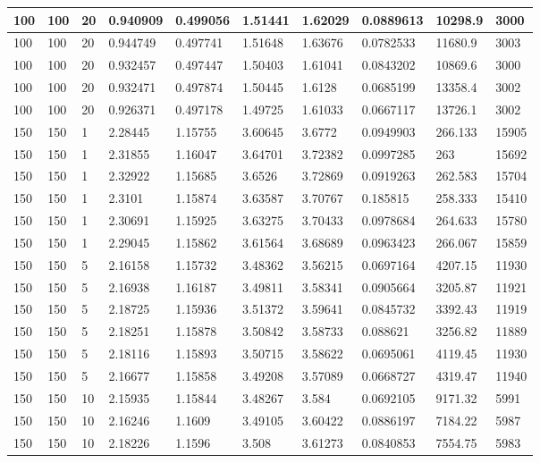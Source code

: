 \begin{landscape}
\begin{longtable}{ | l | l | l | l | l | l | l | l | l | l | }
100 & 100 & 20 & 0.940909 & 0.499056 & 1.51441 & 1.62029 & 0.0889613 & 10298.9 & 3000\\ \hline
100 & 100 & 20 & 0.944749 & 0.497741 & 1.51648 & 1.63676 & 0.0782533 & 11680.9 & 3003\\ \hline
100 & 100 & 20 & 0.932457 & 0.497447 & 1.50403 & 1.61041 & 0.0843202 & 10869.6 & 3000\\ \hline
100 & 100 & 20 & 0.932471 & 0.497874 & 1.50445 & 1.6128 & 0.0685199 & 13358.4 & 3002\\ \hline
100 & 100 & 20 & 0.926371 & 0.497178 & 1.49725 & 1.61033 & 0.0667117 & 13726.1 & 3002\\ \hline
150 & 150 & 1 & 2.28445 & 1.15755 & 3.60645 & 3.6772 & 0.0949903 & 266.133 & 15905\\ \hline
150 & 150 & 1 & 2.31855 & 1.16047 & 3.64701 & 3.72382 & 0.0997285 & 263 & 15692\\ \hline
150 & 150 & 1 & 2.32922 & 1.15685 & 3.6526 & 3.72869 & 0.0919263 & 262.583 & 15704\\ \hline
150 & 150 & 1 & 2.3101 & 1.15874 & 3.63587 & 3.70767 & 0.185815 & 258.333 & 15410\\ \hline
150 & 150 & 1 & 2.30691 & 1.15925 & 3.63275 & 3.70433 & 0.0978684 & 264.633 & 15780\\ \hline
150 & 150 & 1 & 2.29045 & 1.15862 & 3.61564 & 3.68689 & 0.0963423 & 266.067 & 15859\\ \hline
150 & 150 & 5 & 2.16158 & 1.15732 & 3.48362 & 3.56215 & 0.0697164 & 4207.15 & 11930\\ \hline
150 & 150 & 5 & 2.16938 & 1.16187 & 3.49811 & 3.58341 & 0.0905664 & 3205.87 & 11921\\ \hline
150 & 150 & 5 & 2.18725 & 1.15936 & 3.51372 & 3.59641 & 0.0845732 & 3392.43 & 11919\\ \hline
150 & 150 & 5 & 2.18251 & 1.15878 & 3.50842 & 3.58733 & 0.088621 & 3256.82 & 11889\\ \hline
150 & 150 & 5 & 2.18116 & 1.15893 & 3.50715 & 3.58622 & 0.0695061 & 4119.45 & 11930\\ \hline
150 & 150 & 5 & 2.16677 & 1.15858 & 3.49208 & 3.57089 & 0.0668727 & 4319.47 & 11940\\ \hline
150 & 150 & 10 & 2.15935 & 1.15844 & 3.48267 & 3.584 & 0.0692105 & 9171.32 & 5991\\ \hline
150 & 150 & 10 & 2.16246 & 1.1609 & 3.49105 & 3.60422 & 0.0886197 & 7184.22 & 5987\\ \hline
150 & 150 & 10 & 2.18226 & 1.1596 & 3.508 & 3.61273 & 0.0840853 & 7554.75 & 5983\\ \hline

\end{longtable}
\end{landscape}
